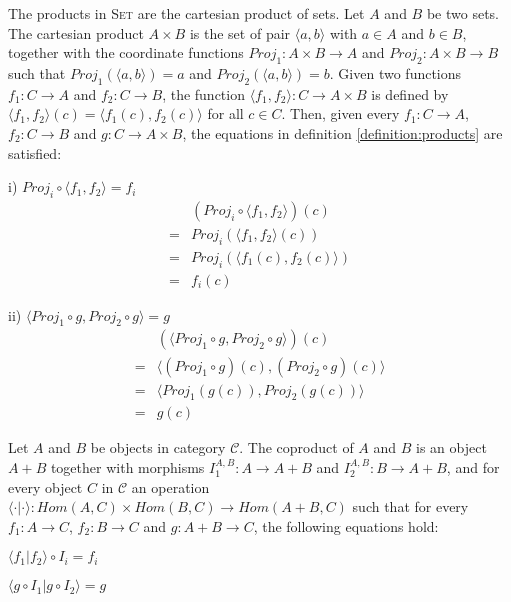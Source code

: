 The products in \textsc{Set} are the cartesian product of sets. Let $ A $ and $ B $ be two sets. The cartesian product $ A \times B $ is the set of pair $ \langle a, b \rangle $ with $ a \in A $ and $ b \in B $, together with the coordinate functions $ Proj_1 : A \times B \to A $ and $ Proj_2 : A \times B \to B $ such that $ Proj_1 ( \langle a, b \rangle ) = a $ and $ Proj_2 ( \langle a, b \rangle ) = b $. Given two functions $ f_1 : C \to A $ and $ f_2 : C \to B $, the function $ \langle f_1 , f_2 \rangle : C \to A \times B $ is defined by $ \langle f_1 , f_2 \rangle (c) = \langle f_1 (c) , f_2 (c) \rangle $ for all $ c \in C $. Then, given every $ f_1 : C \to A $, $ f_2 : C \to B $ and $ g : C \to A \times B $, the equations in definition \ref{definition:products} are satisfied:
\begin{myitemize}
\item[i)] $ Proj_i \circ \langle f_1 , f_2 \rangle = f_i $
\begin{equation*}
\begin{array}{ll}
  & ( Proj_i \circ \langle f_1 , f_2 \rangle )(c)\\
= & Proj_i ( \langle f_1 , f_2 \rangle (c) )\\
= & Proj_i ( \langle f_1 (c) , f_2 (c) \rangle )\\
= & f_i (c)
\end{array}
\end{equation*}
\item[ii)] $ \langle Proj_1 \circ g , Proj_2 \circ g \rangle = g $
\begin{equation*}
\begin{array}{ll}
  & ( \langle Proj_1 \circ g , Proj_2 \circ g \rangle )(c)\\
= & \langle ( Proj_1 \circ g )(c) , ( Proj_2 \circ g )(c) \rangle \\
= & \langle Proj_1 ( g(c) ) , Proj_2 ( g(c) ) \rangle \\
= & g(c)
\end{array}
\end{equation*}
\end{myitemize}

\begin{definition}
\label{definition:coproducts}
Let $ A $ and $ B $ be objects in category $ \mathcal{C} $. The coproduct of $ A $ and $ B $ is an object $ A+B $ together with morphisms $ I_1^{A,B} : A \to A + B $ and $ I_2^{A,B} : B \to A + B $, and for every object $ C $ in $ \mathcal{C} $ an operation $ \langle \cdot | \cdot \rangle : Hom(A,C) \times Hom(B,C) \to Hom(A+B,C) $ such that for every $ f_1 : A \to C $, $ f_2 : B \to C $ and $ g : A+B \to C $, the following equations hold:
\begin{myitemize}
\item $ \langle f_1 | f_2 \rangle \circ I_i = f_i $
\item $ \langle g \circ I_1 | g \circ I_2 \rangle = g $
\end{myitemize}
\end{definition}

